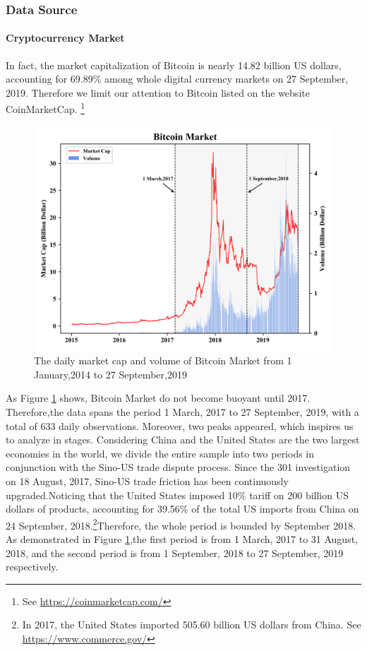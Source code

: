 \documentclass[review]{elsarticle}
\begin{document}
\subsubsection{Data Source}
\paragraph{Cryptocurrency Market}In fact, the market capitalization of Bitcoin is nearly 14.82 billion US dollars, accounting for 69.89\% among whole digital currency markets on 27 September, 2019. Therefore we limit our attention to Bitcoin listed on the website CoinMarketCap. \footnote{See \url{https://coinmarketcap.com/}}

\begin{figure}[htbp]		
	\centering
	\includegraphics[scale=0.7]{BitcoinMarket.png}
	\caption{The daily market cap and volume of Bitcoin Market from 1 January,2014 to 27 September,2019}
	\label{img1}
\end{figure}

As Figure \ref{img1} shows, Bitcoin Market do not become buoyant until 2017. Therefore,the data spans the period 1 March, 2017 to 27 September, 2019, with a total of 633 daily observations. Moreover, two peaks appeared, which inspires us to analyze in stages. Considering China and the United States are the two largest economies in the world, we divide the entire sample into two periods in conjunction with the Sino-US trade dispute process. Since the 301 investigation on 18 August, 2017, Sino-US trade friction has been continuously upgraded.Noticing that the United States imposed 10\% tariff on 200 billion US dollars of products, accounting for 39.56\% of the total US imports from China on 24 September, 2018.\footnote{In 2017, the United States imported 505.60 billion US dollars from China. See \url{https://www.commerce.gov/}}Therefore, the whole period is bounded by September 2018. As demonstrated in Figure \ref{img1},the first period is from 1 March, 2017 to 31 August, 2018, and the second period is from 1 September, 2018 to 27 September, 2019 respectively.
\end{document}
